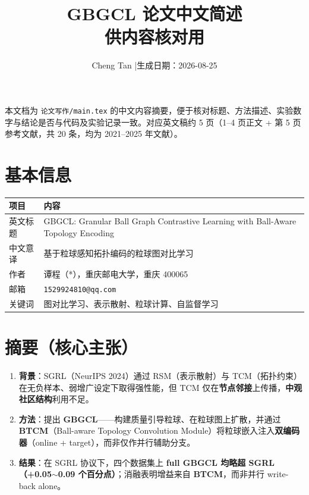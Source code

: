 \documentclass[11pt,a4paper]{article}
\title{\textbf{GBGCL 论文中文简述}\\[0.4em]\large 供内容核对用}
\author{Cheng Tan \quad|\quad 生成日期：2026-08-25}
\date{}
\begin{document}
\maketitle

\noindent
本文档为 \texttt{论文写作/main.tex} 的中文内容摘要，便于核对标题、方法描述、实验数字与结论是否与代码及实验记录一致。对应英文稿约 5 页（1--4 页正文 + 第 5 页参考文献，共 20 条，均为 2021--2025 年文献）。

\section{基本信息}

\begin{table}[h]
\centering
\small
\begin{tabular}{@{}p{3.2cm}p{11cm}@{}}
\toprule
\textbf{项目} & \textbf{内容} \\
\midrule
英文标题 & GBGCL: Granular Ball Graph Contrastive Learning with Ball-Aware Topology Encoding \\
中文意译 & 基于粒球感知拓扑编码的粒球图对比学习 \\
作者 & 谭程（*），重庆邮电大学，重庆 400065 \\
邮箱 & \texttt{1529924810@qq.com} \\
关键词 & 图对比学习、表示散射、粒球计算、自监督学习 \\
\bottomrule
\end{tabular}
\end{table}

\section{摘要（核心主张）}

\begin{enumerate}
  \item \textbf{背景}：SGRL（NeurIPS 2024）通过 RSM（表示散射）与 TCM（拓扑约束）在无负样本、弱增广设定下取得强性能，但 TCM 仅在\textbf{节点邻接}上传播，\textbf{中观社区结构}利用不足。
  \item \textbf{方法}：提出 \textbf{GBGCL}——构建质量引导粒球、在粒球图上扩散，并通过 \textbf{BTCM}（Ball-aware Topology Convolution Module）将粒球嵌入注入\textbf{双编码器}（online + target），而非仅作并行辅助分支。
  \item \textbf{结果}：在 SGRL 协议下，四个数据集上 \textbf{full GBGCL 均略超 SGRL（+0.05$\sim$0.09 个百分点）}；消融表明增益来自 \textbf{BTCM}，而非并行 write-back alone。
\end{enumerate}
\end{document}
